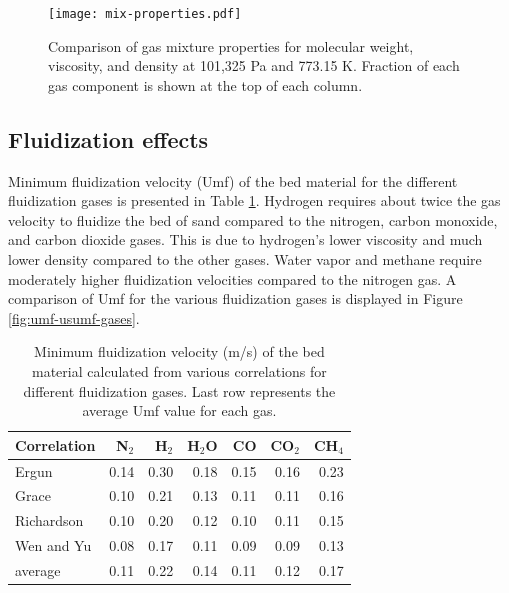 \begin{figure}[H]
    \centering
    \texttt{[image: mix-properties.pdf]}
    \caption{Comparison of gas mixture properties for molecular weight, viscosity, and density at 101,325 Pa and 773.15 K. Fraction of each gas component is shown at the top of each column.}
    \label{fig:mix-properties}
\end{figure}


\subsection{Fluidization effects}

Minimum fluidization velocity (Umf) of the bed material for the different fluidization gases is presented in Table \ref{tab:umf-sand}. Hydrogen requires about twice the gas velocity to fluidize the bed of sand compared to the nitrogen, carbon monoxide, and carbon dioxide gases. This is due to hydrogen's lower viscosity and much lower density compared to the other gases. Water vapor and methane require moderately higher fluidization velocities compared to the nitrogen gas. A comparison of Umf for the various fluidization gases is displayed in Figure \ref{fig:umf-usumf-gases}.

\begin{table}[H]
    \centering
    \caption{Minimum fluidization velocity (m/s) of the bed material calculated from various correlations for different fluidization gases. Last row represents the average Umf value for each gas.}
    \label{tab:umf-sand}
    \begin{tabular}{lrrrrrr}
        \toprule
        Correlation & N$_2$ & H$_2$ & H$_2$O & CO & CO$_2$ & CH$_4$ \\
        \midrule
        Ergun       & 0.14 & 0.30 & 0.18 & 0.15 & 0.16 & 0.23 \\
        Grace       & 0.10 & 0.21 & 0.13 & 0.11 & 0.11 & 0.16 \\
        Richardson  & 0.10 & 0.20 & 0.12 & 0.10 & 0.11 & 0.15 \\
        Wen and Yu  & 0.08 & 0.17 & 0.11 & 0.09 & 0.09 & 0.13 \\
        average     & 0.11 & 0.22 & 0.14 & 0.11 & 0.12 & 0.17 \\
        \bottomrule
    \end{tabular}
\end{table}


